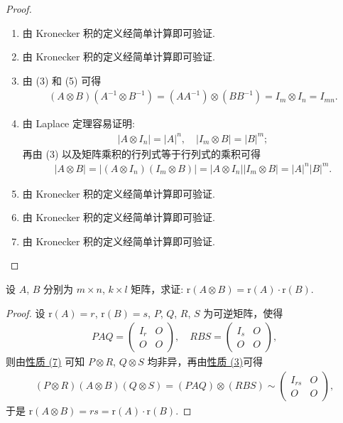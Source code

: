 \documentclass[../../main.tex]{subfiles}%
\begin{document}
\begin{proof}
\begin{enumerate}[(1)]
\item 由 Kronecker 积的定义经简单计算即可验证.

\item 由 Kronecker 积的定义经简单计算即可验证.

\item 由 (3) 和 (5) 可得
\begin{align*}
(A\otimes B)(A^{-1}\otimes B^{-1})=(AA^{-1})\otimes (BB^{-1})=I_m\otimes I_n = I_{mn}.
\end{align*}

\item 由 Laplace 定理容易证明:
\begin{align*}
|A\otimes I_n| = |A|^n, \quad |I_m\otimes B| = |B|^m;
\end{align*}
再由 (3) 以及矩阵乘积的行列式等于行列式的乘积可得
\begin{align*}
|A\otimes B| = |(A\otimes I_n)(I_m\otimes B)| = |A\otimes I_n||I_m\otimes B| = |A|^n|B|^m. 
\end{align*}

\item 由 Kronecker 积的定义经简单计算即可验证.

\item 由 Kronecker 积的定义经简单计算即可验证.

\item 由 Kronecker 积的定义经简单计算即可验证.
\end{enumerate}

\end{proof}

\begin{proposition}[矩阵的Kronecker积的秩]\label{proposition:矩阵的Kronecker积的秩}
设 $A$, $B$ 分别为 $m\times n$, $k\times l$ 矩阵，求证: $\mathrm{r}(A\otimes B)=\mathrm{r}(A)\cdot\mathrm{r}(B)$.
\end{proposition}
\begin{proof}

设 $\mathrm{r}(A)=r$, $\mathrm{r}(B)=s$, $P$, $Q$, $R$, $S$ 为可逆矩阵，使得
\begin{align*}
PAQ = \begin{pmatrix}
I_r & O \\
O & O
\end{pmatrix}, \quad RBS = \begin{pmatrix}
I_s & O \\
O & O
\end{pmatrix},
\end{align*}
则由\hyperref[矩阵的Kronecker积的基本性质(7)]{性质 (7)} 可知 $P\otimes R$, $Q\otimes S$ 均非异，再由\hyperref[矩阵的Kronecker积的基本性质(3)]{性质 (3)}可得
\begin{align*}
(P\otimes R)(A\otimes B)(Q\otimes S)=(PAQ)\otimes (RBS)\sim\begin{pmatrix}
I_{rs} & O \\
O & O
\end{pmatrix},
\end{align*}
于是 $\mathrm{r}(A\otimes B)=rs=\mathrm{r}(A)\cdot\mathrm{r}(B)$.  

\end{proof}
\end{document}
